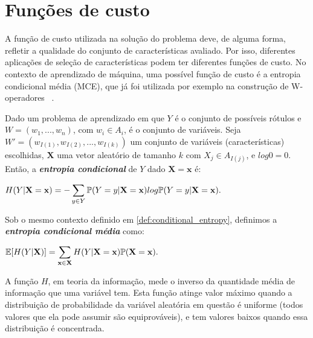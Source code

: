 \section{Funções de custo}
\label{fund_concept:mce} A função de custo utilizada na 
solução do problema deve, de alguma forma, refletir a qualidade do 
conjunto de características avaliado. Por isso,
diferentes aplicações de seleção de características
podem ter diferentes funções de custo. No contexto de aprendizado de 
máquina, uma possível função de custo é a entropia condicional média
(MCE), que já foi utilizada por exemplo na construção de W-operadores
~\cite{MJCJB06}.

\begin{mydefinition}\label{def:conditional_entropy}
Dado um problema de aprendizado em que $Y$ é o conjunto de possíveis
rótulos e $W = (w_1, ..., w_n)$, com $w_i \in A_i$, é o conjunto de
variáveis. Seja $W' = (w_{I(1)}, w_{I(2)}, ..., w_{I(k)})$ um conjunto 
de variáveis (características) escolhidas, $\mathbf{X}$ uma vetor 
aleatório de tamanho $k$ com ${X_j} \in A_{I(j)}$, e $log0 = 0$. Então,
a {\bf \em entropia condicional} de $Y$ dado $\mathbf{X} = \mathbf x$ é:

\begin{center}
$
\begin{aligned}
H (Y | \mathbf{X = x}) = - 
\sum_{y \in Y} \mathbb{P} (Y = y | \mathbf{X = x}) log \mathbb{P} (Y = y | \mathbf{X = x}).
\end{aligned}
$
\end{center}
\end{mydefinition}

\begin{mydefinition}
Sob o mesmo contexto definido em \ref{def:conditional_entropy}, 
definimos a {\bf \em entropia condicional média} como:
\begin{center}
$
\begin{aligned}
    \mathbb{E}[H (Y | \mathbf{X})] = 
    \sum_{\mathbf{x} \in \mathbf{X}} H (Y | \mathbf{X = x}) \mathbb{P} (\mathbf{X = x}).
\end{aligned}
$
\end{center}
\end{mydefinition}


A função $H$, em teoria da informação, mede o inverso da quantidade 
média de informação que uma variável tem. Esta função atinge valor 
máximo quando a distribuição de probabilidade da variável aleatória em
questão é uniforme (todos valores que ela pode assumir são 
equiprováveis), e tem valores baixos quando essa distribuição é 
concentrada. 

